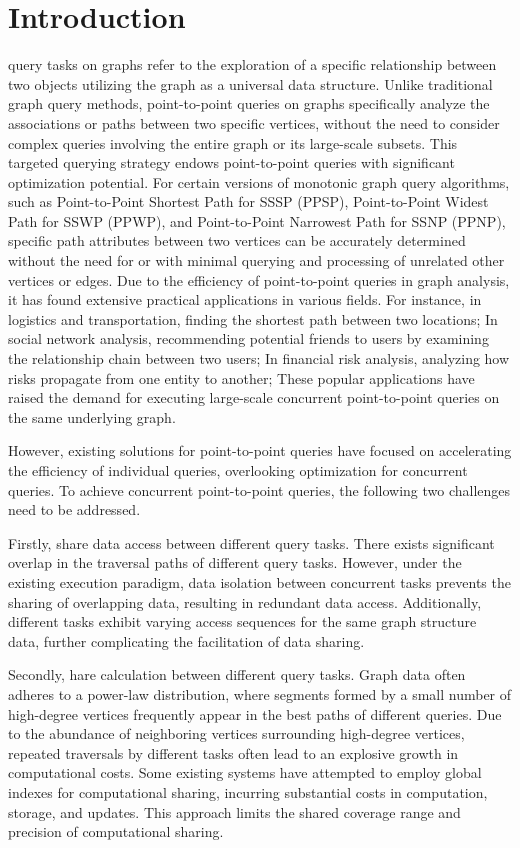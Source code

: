 \documentclass[lettersize,journal]{IEEEtran} %
\begin{document}
\section{Introduction}
 query tasks on graphs refer to the exploration of a specific relationship between two objects utilizing the graph as a universal data structure. Unlike traditional graph query methods, point-to-point queries on graphs specifically analyze the associations or paths between two specific vertices, without the need to consider complex queries involving the entire graph or its large-scale subsets. This targeted querying strategy endows point-to-point queries with significant optimization potential. For certain versions of monotonic graph query algorithms, such as Point-to-Point Shortest Path for SSSP (PPSP), Point-to-Point Widest Path for SSWP (PPWP), and Point-to-Point Narrowest Path for SSNP (PPNP), specific path attributes between two vertices can be accurately determined without the need for or with minimal querying and processing of unrelated other vertices or edges. Due to the efficiency of point-to-point queries in graph analysis, it has found extensive practical applications in various fields. For instance, in logistics and transportation, finding the shortest path between two locations; In social network analysis, recommending potential friends to users by examining the relationship chain between two users; In financial risk analysis, analyzing how risks propagate from one entity to another; These popular applications have raised the demand for executing large-scale concurrent point-to-point queries on the same underlying graph. 

However, existing solutions for point-to-point queries have focused on accelerating the efficiency of individual queries, overlooking optimization for concurrent queries. To achieve concurrent point-to-point queries, the following two challenges need to be addressed.

Firstly, share data access between different query tasks. There exists significant overlap in the traversal paths of different query tasks. However, under the existing execution paradigm, data isolation between concurrent tasks prevents the sharing of overlapping data, resulting in redundant data access. Additionally, different tasks exhibit varying access sequences for the same graph structure data, further complicating the facilitation of data sharing.

Secondly, hare calculation between different query tasks. Graph data often adheres to a power-law distribution, where segments formed by a small number of high-degree vertices frequently appear in the best paths of different queries. Due to the abundance of neighboring vertices surrounding high-degree vertices, repeated traversals by different tasks often lead to an explosive growth in computational costs. Some existing systems have attempted to employ global indexes for computational sharing, incurring substantial costs in computation, storage, and updates. This approach limits the shared coverage range and precision of computational sharing.
\end{document}
